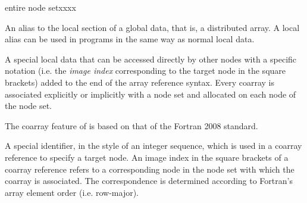 \begin{namelist}{entire node setxxxx}


 An alias to the local section of a global data, that is, a distributed
 array. A local alias can be used in {\XMP} programs in the same way as
 normal local data.


 A special local data that can be accessed directly by other nodes with
 a specific notation (i.e. the {\it image index} corresponding to the
 target node in the square brackets) added to the end of the array
 reference syntax.
%
 Every coarray is associated explicitly or implicitly with a node
 set and allocated on each node of the node set.

 The coarray feature of {\XMP} is based on that of the Fortran 2008
 standard.



 A special identifier, in the style of an integer sequence, which is
 used in a coarray reference to specify a target node. An image index in
 the square brackets of a coarray reference refers to a corresponding
 node in the node set with which the coarray is associated. The
 correspondence is determined according to Fortran's array element order
 (i.e. row-major).


\end{namelist}
